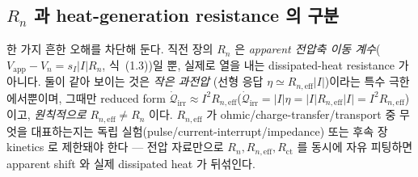 \documentclass[11pt,a4paper]{article}
\newcommand{\eff}{\mathrm{eff}}
\newcommand{\app}{\mathrm{app}}
\newcommand{\irr}{\mathrm{irr}}
\begin{document}
\subsection{$R_n$ 과 heat-generation resistance 의 구분}\label{sec:ch2_Rn}
한 가지 흔한 오해를 차단해 둔다. 직전 장의 $R_n$ 은 \emph{apparent 전압축 이동 계수}($V_\app-V_n=s_I|I|R_n$,
식~(1.3))일 뿐, 실제로 열을 내는 dissipated-heat resistance 가 아니다. 둘이 같아 보이는 것은 \emph{작은 과전압}
(선형 응답 $\eta\simeq R_{n,\eff}|I|$)이라는 특수 극한에서뿐이며, 그때만 reduced form
$\dot{\mathcal Q}_{\irr}\approx I^2R_{n,\eff}$($\dot{\mathcal Q}_\irr=|I|\eta=|I|R_{n,\eff}|I|=I^2R_{n,\eff}$)이고,
\emph{원칙적으로} $R_{n,\eff}\ne R_n$ 이다. $R_{n,\eff}$ 가 ohmic/charge-transfer/transport 중 무엇을 대표하는지는
독립 실험(pulse/current-interrupt/impedance) 또는 후속 장 kinetics 로 제한돼야 한다 — 전압 자료만으로
$R_n,R_{n,\eff},R_{\mathrm{ct}}$ 를 동시에 자유 피팅하면 apparent shift 와 실제 dissipated heat 가 뒤섞인다.

\end{document}
